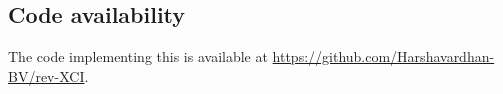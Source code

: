 \documentclass[11pt,a4paper]{article}
\begin{document}
\subsection*{Code availability}
The code implementing this is available at \url{https://github.com/Harshavardhan-BV/rev-XCI}.

 \printbibliography

 
\setcounter{figure}{6}
\begin{figure}[p]
    \centering
    \begin{subfigure}[c]{0.32\textwidth}
        \label{IINN}
    \end{subfigure}
    \begin{subfigure}[c]{0.32\textwidth}
        \label{IIAA}
    \end{subfigure}
    \begin{subfigure}[c]{0.32\textwidth}
        \label{IIII-full}
    \end{subfigure}
    \begin{subfigure}[c]{0.22\textwidth}
        \centering
        \label{topo}
    \end{subfigure}
    \begin{subfigure}[c]{0.35\textwidth}
        \label{rsq-self-full}
    \end{subfigure}
    \begin{subfigure}[c]{0.35\textwidth}
        \label{rsq-self-part}
    \end{subfigure}
    \begin{subfigure}[c]{0.32\textwidth}

\end{subfigure}
\end{figure}
\end{document}
